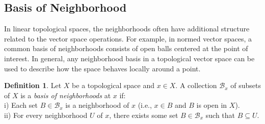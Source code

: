 \documentclass[12pt, reqno]{amsart}
\theoremstyle{definition}
\newtheorem{definition}[theorem]{Definition}
\newtheorem{example}[theorem]{Example}
\numberwithin{equation}{section}
\newcommand{\dR}{{\mathbb R}}
\begin{document}
\subsection{Basis of Neighborhood}
In linear topological spaces, the neighborhoods often have additional structure related to the vector space operations. For example, in normed vector spaces, a common basis of neighborhoods consists of open balls centered at the point of interest. In general, any neighborhood basis in a topological vector space can be used to describe how the space behaves locally around a point.
\begin{definition}
Let \( X \) be a topological space and \( x \in X \). A collection \( \mathcal{B}_x \) of subsets of \( X \) is a \textit{basis of neighborhoods} at \( x \) if: \\
i) Each set \( B \in \mathcal{B}_x \) is a neighborhood of \( x \) (i.e., \( x \in B \) and \( B \) is open in \( X \)).\\
ii) For every neighborhood \( U \) of \( x \), there exists some set \( B \in \mathcal{B}_x \) such that \( B \subseteq U \).
\end{definition}
\begin{comment}
\begin{example}
    Consider $\dR^n$ with the standard topology induced by the Euclidean norm. Let $ x \in \dR^n $.

A typical basis of neighborhoods at $ x $ is given by open balls centered at $ x $. Specifically:

For any point $ x \in \dR^n $, an open ball centered at $ x $ with radius $ r > 0 $ is defined as:
  \[
  B(x, r) = \{ y \in \dR^n \mid \|y - x\| < r \}
  \]
  where $\|\cdot\|$ denotes the Euclidean norm.

The collection of open balls $\{ B(x, r) \mid r > 0 \}$ forms a basis of neighborhoods at $ x $. This is because:
  \begin{itemize}
    \item Each ball $ B(x, r) $ is an open set containing $ x $.
    \item For any open set $ U $ containing $ x $, you can always find a radius $ r $ such that $ B(x, r) \subseteq U $.
  \end{itemize}
  \end{example}    
\end{comment}
\end{document}

